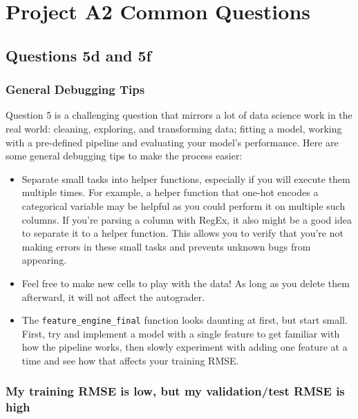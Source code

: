 \documentclass[
  letterpaper,
  DIV=11,
  numbers=noendperiod]{scrreprt}
\providecommand{\tightlist}{%
  \setlength{\itemsep}{0pt}\setlength{\parskip}{0pt}}\usepackage{longtable,booktabs,array}
\begin{document}

\chapter{Project A2 Common Questions}\label{project-a2-common-questions}

\section{Questions 5d and 5f}\label{questions-5d-and-5f}

\subsection{General Debugging Tips}\label{general-debugging-tips}

Question 5 is a challenging question that mirrors a lot of data science
work in the real world: cleaning, exploring, and transforming data;
fitting a model, working with a pre-defined pipeline and evaluating your
model's performance. Here are some general debugging tips to make the
process easier:

\begin{itemize}
\tightlist
\item
  Separate small tasks into helper functions, especially if you will
  execute them multiple times. For example, a helper function that
  one-hot encodes a categorical variable may be helpful as you could
  perform it on multiple such columns. If you're parsing a column with
  RegEx, it also might be a good idea to separate it to a helper
  function. This allows you to verify that you're not making errors in
  these small tasks and prevents unknown bugs from appearing.
\item
  Feel free to make new cells to play with the data! As long as you
  delete them afterward, it will not affect the autograder.
\item
  The \texttt{feature\_engine\_final} function looks daunting at first,
  but start small. First, try and implement a model with a single
  feature to get familiar with how the pipeline works, then slowly
  experiment with adding one feature at a time and see how that affects
  your training RMSE.
\end{itemize}

\subsection{My training RMSE is low, but my validation/test RMSE is
high}\label{my-training-rmse-is-low-but-my-validationtest-rmse-is-high}
\end{document}
